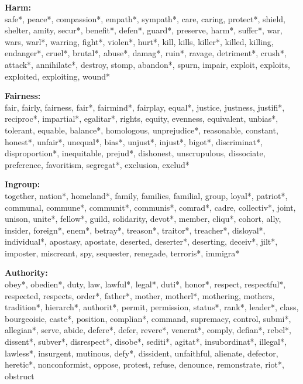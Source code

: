 \documentclass[12pt]{article}
\begin{document}
\textbf{Harm:}\\
safe*, peace*, compassion*, empath*, sympath*, care, caring, protect*, shield, shelter, amity, secur*, benefit*, defen*, guard*, preserve, harm*, suffer*, war, wars, warl*, warring, fight*, violen*, hurt*, kill, kills, killer*, killed, killing, endanger*, cruel*, brutal*, abuse*, damag*, ruin*, ravage, detriment*, crush*, attack*, annihilate*, destroy, stomp, abandon*, spurn, impair, exploit, exploits, exploited, exploiting, wound*
\vspace{.5cm}

\textbf{Fairness:}\\
fair, fairly, fairness, fair*, fairmind*, fairplay, equal*, justice, justness, justifi*, reciproc*, impartial*, egalitar*, rights, equity, evenness, equivalent, unbias*, tolerant, equable, balance*, homologous, unprejudice*, reasonable, constant, honest*, unfair*, unequal*, bias*, unjust*, injust*, bigot*, discriminat*, disproportion*, inequitable, prejud*, dishonest, unscrupulous, dissociate, preference, favoritism, segregat*, exclusion, exclud*
\vspace{.5cm}

\textbf{Ingroup:}\\
together, nation*, homeland*, family, families, familial, group, loyal*, patriot*, communal, commune*, communit*, communis*, comrad*, cadre, collectiv*, joint, unison, unite*, fellow*, guild, solidarity, devot*, member, cliqu*, cohort, ally, insider, foreign*, enem*, betray*, treason*, traitor*, treacher*, disloyal*, individual*, apostasy, apostate, deserted, deserter*, deserting, deceiv*, jilt*, imposter, miscreant, spy, sequester, renegade, terroris*, immigra*
\vspace{.5cm}

\textbf{Authority:}\\
obey*, obedien*, duty, law, lawful*, legal*, duti*, honor*, respect, respectful*, respected, respects, order*, father*, mother, motherl*, mothering, mothers, tradition*, hierarch*, authorit*, permit, permission, status*, rank*, leader*, class, bourgeoisie, caste*, position, complian*, command, supremacy, control, submi*, allegian*, serve, abide, defere*, defer, revere*, venerat*, comply, defian*, rebel*, dissent*, subver*, disrespect*, disobe*, sediti*, agitat*, insubordinat*, illegal*, lawless*, insurgent, mutinous, defy*, dissident, unfaithful, alienate, defector, heretic*, nonconformist, oppose, protest, refuse, denounce, remonstrate, riot*, obstruct
\vspace{.5cm}
\end{document}
